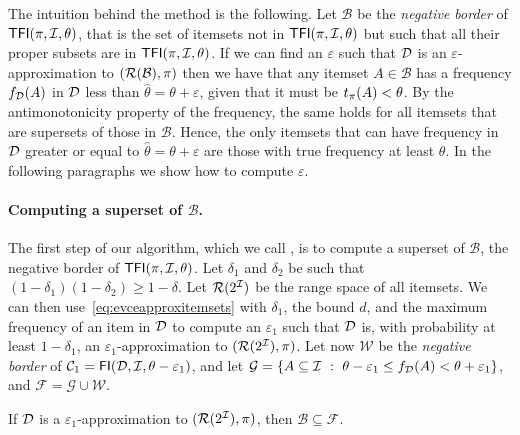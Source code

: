 The intuition behind the method is the following. Let $\mathcal{B}$ be the
\emph{negative border} of $\mathsf{TFI}(\pi,{\cal I},\theta)$, that is the set of itemsets
not in $\mathsf{TFI}(\pi,{\cal I},\theta)$ but such that all their proper subsets are in
$\mathsf{TFI}(\pi,{\cal I},\theta)$. If we can find an $\varepsilon$ such that ${\cal D}$ is an
$\varepsilon$-approximation to $(\mathcal{R}(\mathcal{B}),\pi)$ then we have that any
itemset $A\in\mathcal{B}$ has a frequency $f_{\cal D}(A)$ in ${\cal D}$ less than
$\hat{\theta}=\theta+\varepsilon$, given that it must be $t_\pi(A)<\theta$. By
the antimonotonicity property of the frequency, the same holds for all itemsets
that are supersets of those in $\mathcal{B}$. Hence, the only itemsets that can
have frequency in ${\cal D}$ greater or equal to $\hat{\theta}=\theta+\varepsilon$
are those with true frequency at least $\theta$. In the following paragraphs we
show how to compute $\varepsilon$.

\paragraph{Computing a superset of $\mathcal{B}$.} The first step of our
algorithm, which we call \ALG{}, is to compute a superset of $\mathcal{B}$, the
negative border of $\mathsf{TFI}(\pi,{\cal I},\theta)$. Let $\delta_1$ and $\delta_2$ be
such that $(1-\delta_1)(1-\delta_2)\ge 1-\delta$. Let $\mathcal{R}(2^{\cal I})$ be the
range space of all itemsets.  We can then use~\eqref{eq:evceapproxitemsets}
with $\delta_1$, the bound $d$, and the maximum frequency of an item in ${\cal D}$ to
compute an $\varepsilon_1$ such that ${\cal D}$ is, with probability at least
$1-\delta_1$, an $\varepsilon_1$-approximation to $(\mathcal{R}(2^{\cal I}),\pi)$. Let
now $\mathcal{W}$ be the \emph{negative border} of
$\mathcal{C}_1=\mathsf{FI}({\cal D},{\cal I},\theta-\varepsilon_1)$, and let
$\mathcal{G}=\{A\subseteq{\cal I} ~:~ \theta-\varepsilon_1\le
f_{\cal D}(A)<\theta+\varepsilon_1\}$, and $\mathcal{F}=\mathcal{G}\cup\mathcal{W}$.

\begin{fact}\label{fact:supersetborder}
	If ${\cal D}$ is a $\varepsilon_1$-approximation to $(\mathcal{R}(2^{\cal I}),\pi)$,
	then $\mathcal{B}\subseteq\mathcal{F}$.
\end{fact}

